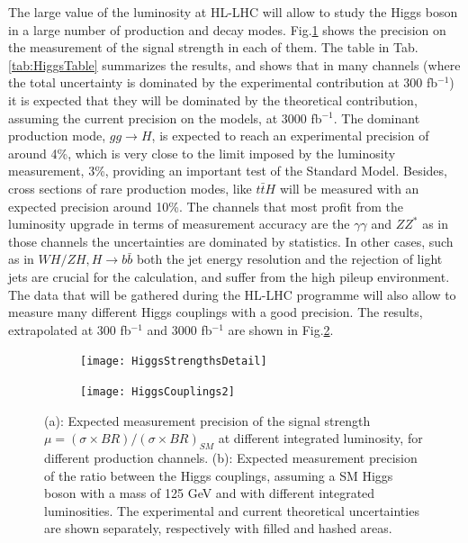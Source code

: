 \documentclass[a4paper,twoside,12pt]{book}
\begin{document}
The large value of the luminosity at HL-LHC will allow to study the Higgs boson in a large number of
production and decay modes. Fig.\ref{fig:HiggsStrengths} shows the precision on the measurement
of the signal strength in each of them. The table in Tab. \ref{tab:HiggsTable} summarizes
the results, and shows that in many channels (where the total uncertainty is
dominated by the experimental contribution at 300 fb$^{-1}$) it is expected that 
they will be dominated by
the theoretical contribution, assuming the current precision on
the models, at 3000 fb$^{-1}$. The dominant production mode, $gg \rightarrow H$, is expected to reach
an experimental precision of around 4\%, which is very close to the limit imposed by the luminosity 
measurement, 3\%, providing an important test of the Standard Model. Besides, cross
sections of rare production modes, like $t\bar{t}H$ will be
measured with an expected precision around 10\%. The channels that most profit from the
luminosity upgrade in terms of measurement accuracy are the $\gamma\gamma$ and $ZZ^*$
as in those channels the uncertainties are dominated by statistics. In other cases, such as in $WH/ZH, H \rightarrow b\bar{b}$ both the jet
energy resolution and the rejection of light jets are crucial for the calculation, and suffer from
the high pileup environment. \\

The data that will be gathered during the HL-LHC programme will also allow to
measure many different Higgs couplings with a good precision. The results, extrapolated
at 300 fb$^{-1}$ and 3000 fb$^{-1}$ are shown in Fig.\ref{fig:higgsCouplings}.\\



\begin{figure} [h]
\begin{subfigure}{.5\linewidth}
	\centering
	\texttt{[image: HiggsStrengthsDetail]}
	\caption{}
	\label{fig:HiggsStrengths}
\end{subfigure}
\begin{subfigure}{.5\linewidth}
	\centering
	\texttt{[image: HiggsCouplings2]}
	\caption{}
	\label{fig:higgsCouplings}
\end{subfigure}
\caption{(a): Expected measurement precision of the signal strength $\mu = (\sigma \times BR)/(\sigma \times BR)_{SM}$\cite{loi} at different integrated luminosity, for different
	production channels. (b): Expected measurement precision of the ratio between the
	Higgs couplings, assuming a SM Higgs boson with a mass of 125 GeV and with different integrated luminosities.
	 The experimental and current theoretical uncertainties are shown separately, respectively with filled and hashed areas\cite{higgsNote}.}
\label{fig:higgsMeasurement}
\end{figure}
\end{document}
